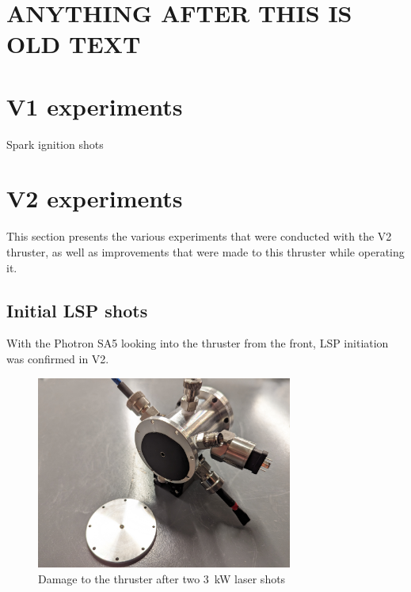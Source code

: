     \section{ANYTHING AFTER THIS IS OLD TEXT}

    \section{V1 experiments}
        
        Spark ignition shots

    \section{V2 experiments}
        This section presents the various experiments that were conducted with the V2 thruster, as well as improvements that were made to this thruster while operating it.
    
        \subsection{Initial LSP shots}

            With the Photron SA5 looking into the thruster from the front, LSP initiation was confirmed in V2.

            \begin{figure}[!ht]
                \centering
                \includegraphics[width=0.75\textwidth]{assets/4 experiments/V2 test damage.jpg}
                \caption{Damage to the thruster after two \qty{3}{kW} laser shots}
            \end{figure}

